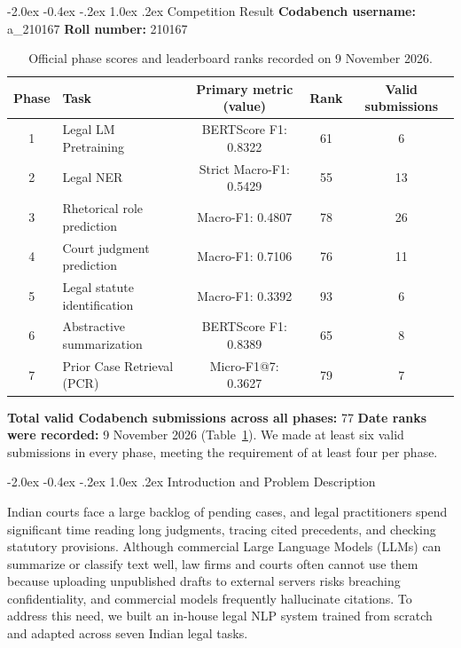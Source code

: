 \documentclass[11pt, oneside]{article}
\makeatletter
\renewcommand\section{\@startsection {section}{1}{\z@}%
  {-2.0ex \@plus -0.4ex \@minus -.2ex}%
  {1.0ex \@plus.2ex}%
  {\normalfont\Large\bfseries}}
\makeatother
\begin{document}
\section{Competition Result}
\noindent
\textbf{Codabench username:} a\_210167
\hfill
\textbf{Roll number:} 210167
\smallskip
\noindent
\begin{table}[H]
\centering
\scriptsize
\renewcommand{\arraystretch}{0.90}
\caption{Official phase scores and leaderboard ranks recorded on 9 November 2026.}
\label{tab:leaderboard}
\begin{tabular}{clccc}
\toprule
Phase & Task & Primary metric (value) & Rank & Valid submissions \\
\midrule
1 & Legal LM Pretraining & BERTScore F1: 0.8322 & 61 & 6 \\
2 & Legal NER & Strict Macro-F1: 0.5429 & 55 & 13 \\
3 & Rhetorical role prediction & Macro-F1: 0.4807 & 78 & 26 \\
4 & Court judgment prediction & Macro-F1: 0.7106 & 76 & 11 \\
5 & Legal statute identification & Macro-F1: 0.3392 & 93 & 6 \\
6 & Abstractive summarization & BERTScore F1: 0.8389 & 65 & 8 \\
7 & Prior Case Retrieval (PCR) & Micro-F1@7: 0.3627 & 79 & 7 \\
\bottomrule
\end{tabular}
\end{table}
\noindent
\textbf{Total valid Codabench submissions across all phases:} 77 \quad \textbf{Date ranks were recorded:} 9 November 2026 (Table~\ref{tab:leaderboard}). We made at least six valid submissions in every phase, meeting the requirement of at least four per phase.

\section{Introduction and Problem Description}

Indian courts face a large backlog of pending cases, and legal practitioners spend significant time reading long judgments, tracing cited precedents, and checking statutory provisions. Although commercial Large Language Models (LLMs) can summarize or classify text well, law firms and courts often cannot use them because uploading unpublished drafts to external servers risks breaching confidentiality, and commercial models frequently hallucinate citations. To address this need, we built an in-house legal NLP system trained from scratch and adapted across seven Indian legal tasks.
\end{document}
